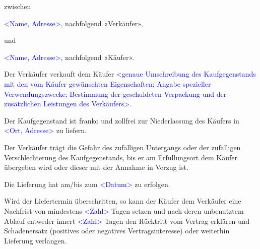 \documentclass[parskip=half]{scrreprt}
\begin{document}

zwischen

\textcolor{blue}{<Name, Adresse>}, nachfolgend «Verkäufer»,

und

\textcolor{blue}{<Name, Adresse>}, nachfolgend «Käufer».



\begin{contract}


Der Verkäufer verkauft dem Käufer \textcolor{blue}{<genaue Umschreibung des Kaufgegenstands mit den vom Käufer gewünschten Eigenschaften; Angabe spezieller Verwendungszwecke; Bestimmung der geschuldeten Verpackung und der zusätzlichen Leistungen des Verkäufers>}.

\parnumbertrue


Der Kaufgegenstand ist franko und zollfrei zur Niederlassung des Käufers in \textcolor{blue}{<Ort, Adresse>} zu liefern.

Der Verkäufer trägt die Gefahr des zufälligen Untergangs oder der zufälligen Verschlechterung des Kaufgegenstands, bis er am Erfüllungsort dem Käufer übergeben wird oder dieser mit der Annahme in Verzug ist.

\parnumbertrue


Die Lieferung hat am/bis zum \textcolor{blue}{<Datum>} zu erfolgen.

Wird der Liefertermin überschritten, so kann der Käufer dem Verkäufer eine Nachfrist von mindestens \textcolor{blue}{<Zahl>} Tagen setzen und nach deren unbenutztem Ablauf entweder innert \textcolor{blue}{<Zahl>} Tagen den Rücktritt vom Vertrag erklären und Schadenersatz (positives oder negatives Vertragsinteresse) oder weiterhin Lieferung verlangen.


\end{contract}
\end{document}
